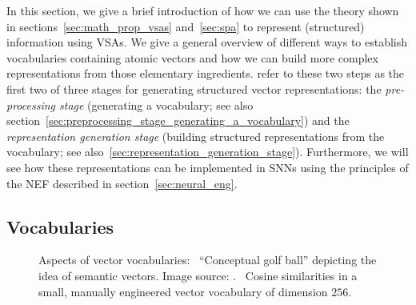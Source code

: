 In this section, we give a brief introduction of how we can use the theory shown in sections~\ref{sec:math_prop_vsas} and~\ref{sec:spa} to represent (structured) information using \acp{VSA}.
We give a general overview of different ways to establish vocabularies containing atomic vectors and how we can build more complex representations from those elementary ingredients.
\textcite{Gallant2013} refer to these two steps as the first two of three stages for generating structured vector representations: the \emph{pre-processing stage} (generating a vocabulary; see also section~\ref{sec:preprocessing_stage_generating_a_vocabulary}) and the \emph{representation generation stage} (building structured representations from the vocabulary; see also~\ref{sec:representation_generation_stage}).
Furthermore, we will see how these representations can be implemented in \acp{SNN} using the principles of the \ac{NEF} described in section~\ref{sec:neural_eng}.

\subsection{Vocabularies}
\label{subsec:vocabs}

\begin{figure}[t!]
	\centering
	\caption{Aspects of vector vocabularies:~\protect{} \enquote{Conceptual golf ball} depicting the idea of semantic vectors. Image source: \textcite{Eliasmith2013}.~\protect{} Cosine similarities in a small, manually engineered vector vocabulary of dimension $256$.}
    \label{fig:vector vocabs}
\end{figure}

